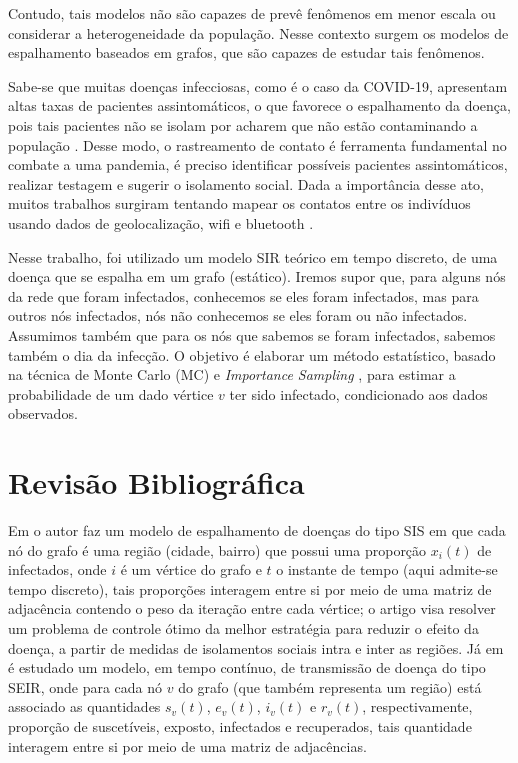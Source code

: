 \documentclass{article}
\begin{document}
Contudo, tais modelos não são capazes de prevê fenômenos em menor escala ou considerar a heterogeneidade da população. Nesse contexto surgem os modelos de espalhamento baseados em grafos, que são capazes de estudar tais fenômenos.

Sabe-se que muitas doenças infecciosas, como é o caso da COVID-19, apresentam altas taxas de pacientes assintomáticos, o que favorece o espalhamento da doença, pois tais pacientes não se isolam por acharem que não estão contaminando a população \cite{asymptomatic}. Desse modo, o rastreamento de contato é ferramenta fundamental no combate a uma pandemia, é preciso identificar possíveis pacientes assintomáticos, realizar testagem e sugerir o isolamento social. Dada a importância desse ato, muitos trabalhos surgiram tentando mapear os contatos entre os indivíduos usando dados de geolocalização, wifi e bluetooth \cite{ceara, tracing, tracing2}.

Nesse trabalho, foi utilizado um modelo SIR teórico em tempo discreto, de uma doença que se espalha em um grafo (estático). Iremos supor que, para alguns nós da rede que foram infectados, conhecemos se eles foram infectados, mas para outros nós infectados, nós não conhecemos se eles foram ou não infectados. Assumimos também que para os nós que sabemos se foram infectados, sabemos também o dia da infecção. O objetivo é elaborar um método estatístico, basado na técnica de Monte Carlo (MC) e \textit{Importance Sampling} \cite{ImportSample}, para estimar a probabilidade de um dado vértice $v$ ter sido infectado, condicionado aos dados observados.

\section{Revisão Bibliográfica}

Em \cite{SISCidadeControle} o autor faz um modelo de espalhamento de doenças do tipo SIS em que cada nó do grafo é uma região (cidade, bairro) que possui uma proporção $x_i(t)$ de infectados, onde $i$ é um vértice do grafo e $t$ o instante de tempo (aqui admite-se tempo discreto), tais proporções interagem entre si por meio de uma matriz de adjacência contendo o peso da iteração entre cada vértice; o artigo visa resolver um problema de controle ótimo da melhor estratégia para reduzir o efeito da doença, a partir de medidas de isolamentos sociais intra e inter as regiões. Já em \cite{SEIRgrafo} é estudado um modelo, em tempo contínuo, de transmissão de doença do tipo SEIR, onde para cada nó $v$ do grafo (que também representa um região) está associado as quantidades $s_v(t)$, $e_v(t)$, $i_v(t)$ e $r_v(t)$, respectivamente, proporção de suscetíveis, exposto, infectados e recuperados, tais quantidade interagem entre si por meio de uma matriz de adjacências.
\end{document}
